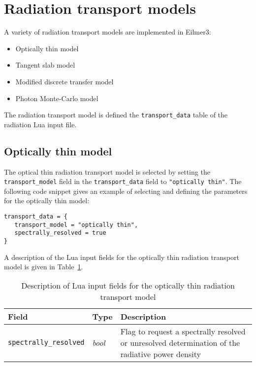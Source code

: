 \section{Radiation transport models}
\label{app:rt-models}

A variety of radiation transport models are implemented in Eilmer3:

\begin{itemize}
 \item Optically thin model
 \item Tangent slab model 
 \item Modified discrete transfer model
 \item Photon Monte-Carlo model
\end{itemize}

The radiation transport model is defined the \texttt{transport\_data} table of the radiation Lua input file.

\subsection{Optically thin model}

The optical thin radiation transport model is selected by setting the \texttt{transport\_model} field in the \texttt{transport\_data} field to \texttt{"optically thin"}.
The following code snippet gives an example of selecting and defining the parameters for the optically thin model:

\noindent \topbar
\begin{lstlisting}[basicstyle=\ttfamily\normalsize]
transport_data = {
   transport_model = "optically thin",
   spectrally_resolved = true
}
\end{lstlisting}
\bottombar

A description of the Lua input fields for the optically thin radiation transport model is given in Table~\ref {tab:OT-input}.

\begin{table}[h]
 \begin{center}
  \caption{Description of Lua input fields for the optically thin radiation transport model}
  \label{tab:OT-input}
\begin{tabular}{llp{8cm}}
 \hline \hline
 Field                                                   & Type                 &  Description \\ \hline
\texttt{spectrally\_resolved}            & \textit{bool}       &  Flag to request a spectrally resolved or unresolved determination of the radiative power density \\
\hline
\end{tabular}
\end{center}
\end{table}

